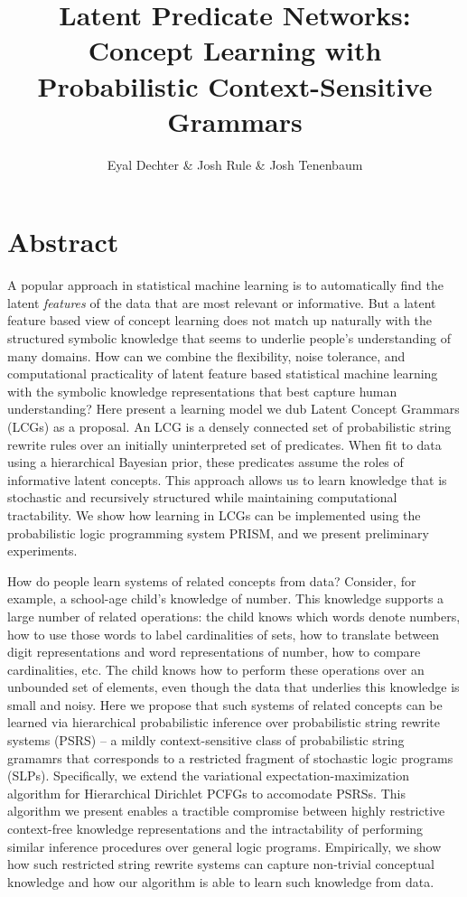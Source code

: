 \documentclass[11pt, twocolumn]{article}
\title{Latent Predicate Networks: Concept Learning with Probabilistic Context-Sensitive Grammars}
\author{Eyal Dechter \& Josh Rule \& Josh Tenenbaum}
\begin{document}
\maketitle

\section{Abstract}
A popular approach in statistical machine learning is to automatically
find the latent \emph{features} of the data that are most relevant or
informative. But a latent feature based view of concept learning does
not match up naturally with the structured symbolic knowledge that
seems to underlie people's understanding of many domains. How can we
combine the flexibility, noise tolerance, and computational
practicality of latent feature based statistical machine learning with
the symbolic knowledge representations that best capture human
understanding? Here present a learning model we dub Latent Concept
Grammars (LCGs) as a proposal. An LCG is a densely connected set of
probabilistic string rewrite rules over an initially uninterpreted set
of predicates. When fit to data using a hierarchical Bayesian prior,
these predicates assume the roles of informative latent concepts. This
approach allows us to learn knowledge that is stochastic and
recursively structured while maintaining computational
tractability. We show how learning in LCGs can be implemented using
the probabilistic logic programming system PRISM, and we present
preliminary experiments.

How do people learn systems of related concepts from
data?  Consider, for example, a school-age child's knowledge of
number. This knowledge supports a large number of related operations:
the child knows which words denote numbers, how to use those words to
label cardinalities of sets, how to translate between digit
representations and word representations of number, how to compare
cardinalities, etc. The child knows how to perform these operations
over an unbounded set of elements, even though the data that underlies
this knowledge is small and noisy. Here we propose that such systems
of related concepts can be learned via hierarchical probabilistic
inference over probabilistic string rewrite systems (PSRS) -- a mildly
context-sensitive class of probabilistic string gramamrs that
corresponds to a restricted fragment of stochastic logic programs
(SLPs). Specifically, we extend the variational
expectation-maximization algorithm for Hierarchical Dirichlet PCFGs to
accomodate PSRSs. This algorithm we present enables a tractible
compromise between highly restrictive context-free knowledge
representations and the intractability of performing similar inference
procedures over general logic programs. Empirically, we show how such
restricted string rewrite systems can capture non-trivial conceptual
knowledge and how our algorithm is able to learn such knowledge from
data.
\end{document}
